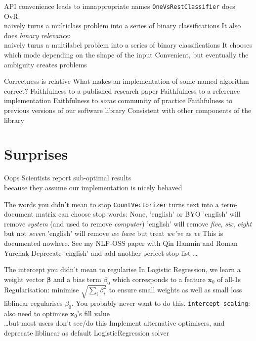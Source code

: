 \documentclass[aspectratio=169, 22pt]{beamer}
\newcommand{\hl}{\textcolor{usydred}}
\begin{document}
\begin{points}{API convenience leads to imnappropriate names}
	\p \verb|OneVsRestClassifier| does OvR:\\
	naively turns a multiclass problem into a series of binary classifications
	\p It also does \emph{binary relevance}:\\
	naively turns a multilabel problem into a series of binary classifications
	\p It chooses which mode depending on the shape of the input
	\p Convenient, but eventually the ambiguity creates problems
	\pause
	\p[Unsolved]
\end{points}

\begin{points}{Correctness is relative}
	\p What makes an implementation of some named algorithm \hl{correct}?
	\p Faithfulness to a published research paper
	\p Faithfulness to a reference implementation
	\p Faithfulness to \emph{some} community of practice
	\p Faithfulness to previous versions of our software library
	\p Consistent with other components of the library
\end{points}

\section{Surprises}

\begin{centre}{Oops}
	Scientists report sub-optimal results\\
	because they assume our implementation is nicely behaved
\end{centre}

\begin{points}{The words you didn't mean to stop}
	\p \verb|CountVectorizer| turns text into a term-document matrix
	\p can choose stop words: None, 'english' or BYO
	\p 'english' will remove \emph{system} (and used to remove \emph{computer})
	\p 'english' will remove \emph{five}, \emph{six}, \emph{eight} but not \emph{seven}
	\p 'english' will remove \emph{we have} but treat \emph{we've} as \emph{ve}
	\p This is documented nowhere.
	\p See my NLP-OSS paper with Qin Hanmin and Roman Yurchak
	\pause
	\p[Solution] Deprecate 'english' 
	\pause and add another \hl{perfect} stop list \ldots
\end{points}

\begin{points}{The intercept you didn't mean to regularise}
	\p In Logistic Regression, we learn a weight vector $\mathbf{\beta}$
	\p and a bias term $\beta_0$ which corresponds to a feature $\mathbf{x}_0$ of all-1s
	\p Regularisation: minimise $\sqrt{\sum_i \beta_i^2}$ to ensure small weights as well as small loss 
	\p liblinear regularises $\beta_0$. You probably never want to do this.
	\p[Sol'n 1] \verb|intercept_scaling|: also need to optimise $\mathbf{x}_0$'s fill value\\
	\ldots but most users don't see/do this
	\p[Sol'n 2] Implement alternative optimisers, and deprecate liblinear as default LogisticRegression solver
\end{points}
\end{document}
